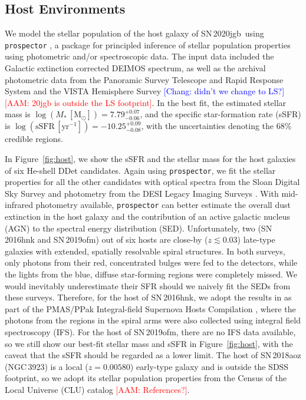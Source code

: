 \documentclass[twocolumn]{aastex631}
\newcommand{\sn}{SN\,2020jgb}
\newcommand{\adam}[1]{\textcolor{red}{[AAM: #1]}}
\newcommand{\chang}[1]{\textcolor{blue}{[Chang: #1]}}
\begin{document}
\subsection{Host Environments} \label{sec:host}
We model the stellar population of the host galaxy of \sn\ using \texttt{prospector} \citep{Johnson_prospector_2021}, a package for principled inference of stellar population properties using photometric and/or spectroscopic data. The input data included the Galactic extinction corrected DEIMOS spectrum, as well as the archival photometric data from the Panoramic Survey Telescope and Rapid Response System \citep[Pan-STARRS;][{\it r, i, z} Kron magnitudes]{PS1_2016}  and the VISTA Hemisphere Survey \citep[VHS;][J and $\mathrm{K}_\mathrm{s}$ Petrosian magnitudes]{VHS_2013} \chang{didn't we change to LS?} \adam{20jgb is outside the LS footprint}. In the best fit, the estimated stellar mass is $\log (M_*\,[\mathrm{M_\odot}])=7.79_{-0.06}^{+0.07}$, and the specific star-formation rate (sSFR) is $\log (\mathrm{sSFR}\,[\mathrm{yr}^{-1}])=-10.25_{-0.08}^{+0.09}$, with the uncertainties denoting the 68\% credible regions.

In Figure~\ref{fig:host}, we show the sSFR and the stellar mass for the host galaxies of six He-shell DDet candidates. Again using \texttt{prospector}, we fit the stellar properties for all the other candidates with optical spectra from the Sloan Digital Sky Survey \citep[SDSS;][]{York_2000} and photometry from the DESI Legacy Imaging Surveys \citep[][{\it g, r, z, $W_1$, $W_2$, $W_3$, $W_4$} magnitudes]{Dey_2019}. With mid-infrared photometry available, \texttt{prospector} can better estimate the overall dust extinction in the host galaxy and the contribution of an active galactic nucleus (AGN) to the spectral energy distribution (SED). Unfortunately, two (SN\,2016hnk and SN\,2019ofm) out of six hosts are close-by ($z\lesssim 0.03$) late-type galaxies with extended, spatially resolvable spiral structures. In both surveys, only photons from their red, concentrated bulges were fed to the detectors, while the lights from the blue, diffuse star-forming regions were completely missed. We would inevitably underestimate their SFR should we naively fit the SEDs from these surveys. Therefore, for the host of SN\,2016hnk, we adopt the results in \citet{galbany_16hnk_2019} as part of the PMAS/PPak Integral-field Supernova Hosts Compilation \citep[PISCO;][]{Galbany_PISCO_2018}, where the photons from the  regions in the spiral arms were also collected using integral field spectroscopy (IFS). For the host of SN\,2019ofm, there are no IFS data available, so we still show our best-fit stellar mass and sSFR in Figure~\ref{fig:host}, with the caveat that the sSFR should be regarded as a lower limit. The host of SN\,2018aoz (NGC\,3923) is a local ($z=0.00580$) early-type galaxy and is outside the SDSS footprint, so we adopt its stellar population properties from the Census of the Local Universe (CLU) catalog \adam{References?}.
\end{document}
